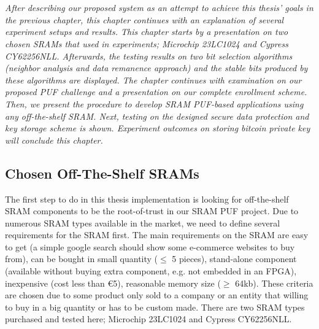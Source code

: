 \chapter{\chapterFive}
\label{chp:5}

\textit{After describing our proposed system as an attempt to achieve this thesis' goals in the previous chapter, this chapter continues with an explanation of several experiment setups and results. This chapter starts by a presentation on two chosen SRAMs that used in experiments; Microchip 23LC1024 and Cypress CY62256NLL. Afterwards, the testing results on two bit selection algorithms (neighbor analysis and data remanence approach) and the stable bits produced by these algorithms are displayed. The chapter continues with examination on our proposed PUF challenge and a presentation on our complete enrollment scheme. Then, we present the procedure to develop SRAM PUF-based applications using any off-the-shelf SRAM.
Next, testing on the designed secure data protection and key storage scheme is shown. Experiment outcomes on storing bitcoin private key will conclude this chapter.}

\section{Chosen Off-The-Shelf SRAMs}
The first step to do in this thesis implementation is looking for off-the-shelf SRAM components to be the root-of-trust in our SRAM PUF project.
Due to numerous SRAM types available in the market, we need to define several requirements for the SRAM first. The main requirements on the SRAM are easy to get (a simple google search should show some e-commerce websites to buy from), can be bought in small quantity ($\leq$ 5 pieces), stand-alone component (available without buying extra component, e.g. not embedded in an FPGA), inexpensive (cost less than \euro{}5), reasonable memory size ($\geq$ 64kb). These criteria are chosen due to some product only sold to a company or an entity that willing to buy in a big quantity or has to be custom made. There are two SRAM types purchased and tested here; Microchip 23LC1024 and Cypress CY62256NLL.

%

